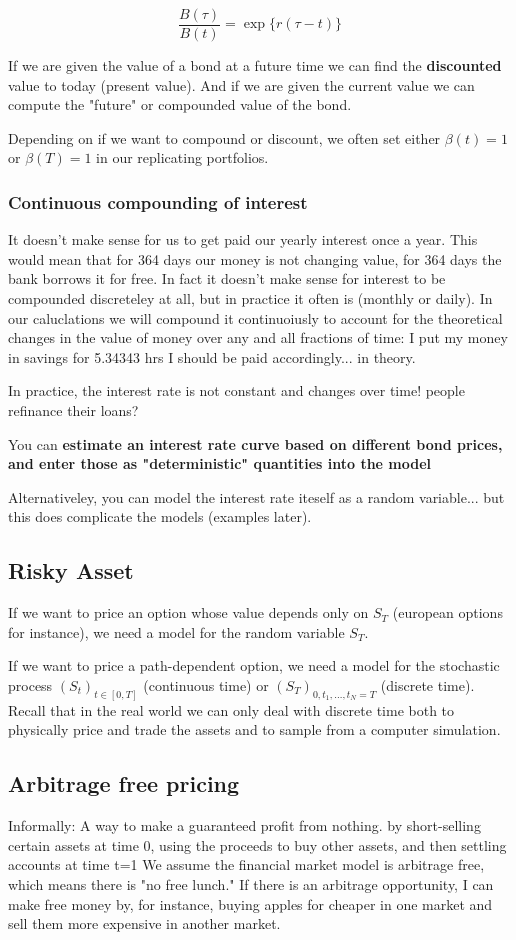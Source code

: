 \documentclass{article}
\begin{document}
\[ \frac{B(\tau)}{B(t)} = \exp\{r(\tau-t)\} \]

If we are given the value of a bond at a future time we can find the \textbf{discounted} value to today (present value). And if we are given the current value we can compute the "future" or compounded value of the bond. 

Depending on if we want to compound or discount, we often set either $\beta(t) = 1$ or $\beta(T) = 1$ in our replicating portfolios. 


\subsubsection{Continuous compounding of interest}
It doesn't make sense for us to get paid our yearly interest once a year. This would mean that for 364 days our money is not changing value, for 364 days the bank borrows it for free. In fact it doesn't make sense for interest to be compounded discreteley at all, but in practice it often is (monthly or daily). In our caluclations we will compound it continuoiusly to account for the theoretical changes in the value of money over any and all fractions of time: I put my money in savings for 5.34343 hrs I should be paid accordingly... in theory.

In practice, the interest rate is not constant and changes over time! people refinance their loans?

You can \textbf{estimate an interest rate curve based on different bond prices, and enter those as "deterministic" quantities into the model}

Alternativeley, you can model the interest rate iteself as a random variable... but this does complicate the models (examples later). 


\subsection{Risky Asset}
If we want to price an option whose value depends only on $S_T$ (european options for instance), we need a model for the random variable $S_T$. 

If we want to price a path-dependent option, we need a model for the stochastic process $(S_t)_{t\in[0,T]}$ (continuous time) or $(S_T)_{0, t_1, 
\dots, t_N = T}$ (discrete time). Recall that in the real world we can only deal with discrete time both to physically price and trade the assets and to sample from a computer simulation.

\subsection{Arbitrage free pricing}
Informally: A way to make a guaranteed profit from nothing. by short-selling certain assets at time 0, using the proceeds to buy other assets, and then settling accounts at time t=1
We assume the financial market model is arbitrage free, which means there is "no free lunch." If there is an arbitrage opportunity, I can make free money by, for instance, buying apples for cheaper in one market and sell them more expensive in another market. 
\end{document}
